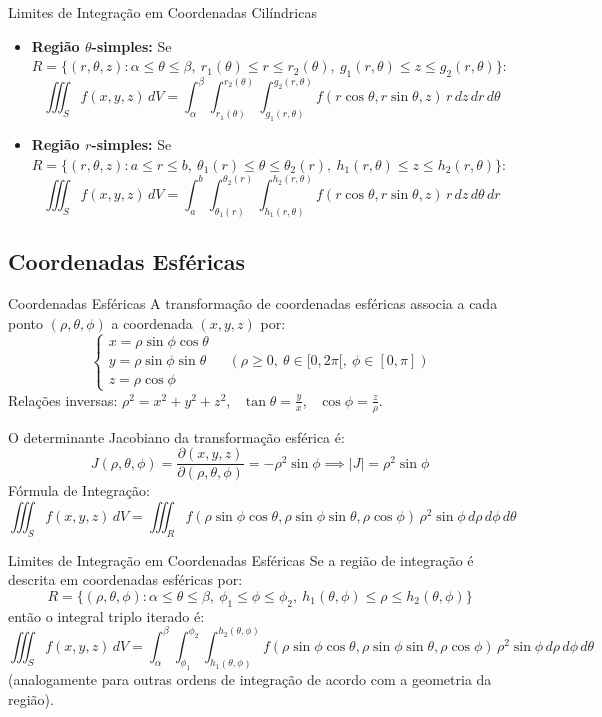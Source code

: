 \documentclass[11pt,a4paper]{article}
\begin{document}
\begin{theorembox}{Limites de Integração em Coordenadas Cilíndricas}
  \begin{itemize}
    \item \textbf{Região $\theta$-simples:} Se $R = \{(r, \theta, z) : \alpha \le \theta \le \beta, \ r_1(\theta) \le r \le r_2(\theta), \ g_1(r, \theta) \le z \le g_2(r, \theta)\}$:
      \[ \iiint_S f(x, y, z) \, dV = \int_\alpha^\beta \int_{r_1(\theta)}^{r_2(\theta)} \int_{g_1(r,\theta)}^{g_2(r,\theta)} f(r\cos\theta, r\sin\theta, z) \, r \, dz \, dr \, d\theta \]
    \item \textbf{Região $r$-simples:} Se $R = \{(r, \theta, z) : a \le r \le b, \ \theta_1(r) \le \theta \le \theta_2(r), \ h_1(r, \theta) \le z \le h_2(r, \theta)\}$:
      \[ \iiint_S f(x, y, z) \, dV = \int_a^b \int_{\theta_1(r)}^{\theta_2(r)} \int_{h_1(r,\theta)}^{h_2(r,\theta)} f(r\cos\theta, r\sin\theta, z) \, r \, dz \, d\theta \, dr \]
  \end{itemize}
\end{theorembox}

\subsection{Coordenadas Esféricas}

\begin{definitionbox}{Coordenadas Esféricas}
  A transformação de coordenadas esféricas associa a cada ponto $(\rho, \theta, \phi)$ a coordenada $(x,y,z)$ por:
  \[ \begin{cases} x = \rho \sin\phi \cos\theta \\ y = \rho \sin\phi \sin\theta \\ z = \rho \cos\phi \end{cases} \quad (\rho \ge 0, \ \theta \in [0, 2\pi[, \ \phi \in [0, \pi]) \]
  Relações inversas: $\rho^2 = x^2 + y^2 + z^2$, \ $\tan\theta = \frac{y}{x}$, \ $\cos\phi = \frac{z}{\rho}$.
  
  O determinante Jacobiano da transformação esférica é:
  \[ J(\rho, \theta, \phi) = \frac{\partial(x,y,z)}{\partial(\rho,\theta,\phi)} = -\rho^2 \sin\phi \implies |J| = \rho^2 \sin\phi \]
  Fórmula de Integração:
  \[ \iiint_S f(x,y,z) \, dV = \iiint_R f(\rho\sin\phi\cos\theta, \rho\sin\phi\sin\theta, \rho\cos\phi) \, \rho^2 \sin\phi \, d\rho \, d\phi \, d\theta \]
\end{definitionbox}

\begin{theorembox}{Limites de Integração em Coordenadas Esféricas}
  Se a região de integração é descrita em coordenadas esféricas por:
  \[ R = \{(\rho, \theta, \phi) : \alpha \le \theta \le \beta, \ \phi_1 \le \phi \le \phi_2, \ h_1(\theta, \phi) \le \rho \le h_2(\theta, \phi)\} \]
  então o integral triplo iterado é:
  \[ \iiint_S f(x, y, z) \, dV = \int_\alpha^\beta \int_{\phi_1}^{\phi_2} \int_{h_1(\theta, \phi)}^{h_2(\theta, \phi)} f(\rho\sin\phi\cos\theta, \rho\sin\phi\sin\theta, \rho\cos\phi) \, \rho^2 \sin\phi \, d\rho \, d\phi \, d\theta \]
  (analogamente para outras ordens de integração de acordo com a geometria da região).
\end{theorembox}
\end{document}
